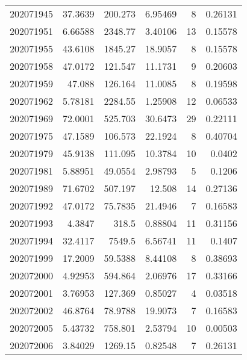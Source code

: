 \begin{tabular}{rrrrrr}
 202071945 &         37.3639  &      200.273  &            6.95469 &           8 & 0.26131 \\
 202071951 &          6.66588 &     2348.77   &            3.40106 &          13 & 0.15578 \\
 202071955 &         43.6108  &     1845.27   &           18.9057  &           8 & 0.15578 \\
 202071958 &         47.0172  &      121.547  &           11.1731  &           9 & 0.20603 \\
 202071959 &         47.088   &      126.164  &           11.0085  &           8 & 0.19598 \\
 202071962 &          5.78181 &     2284.55   &            1.25908 &          12 & 0.06533 \\
 202071969 &         72.0001  &      525.703  &           30.6473  &          29 & 0.22111 \\
 202071975 &         47.1589  &      106.573  &           22.1924  &           8 & 0.40704 \\
 202071979 &         45.9138  &      111.095  &           10.3784  &          10 & 0.0402  \\
 202071981 &          5.88951 &       49.0554 &            2.98793 &           5 & 0.1206  \\
 202071989 &         71.6702  &      507.197  &           12.508   &          14 & 0.27136 \\
 202071992 &         47.0172  &       75.7835 &           21.4946  &           7 & 0.16583 \\
 202071993 &          4.3847  &      318.5    &            0.88804 &          11 & 0.31156 \\
 202071994 &         32.4117  &     7549.5    &            6.56741 &          11 & 0.1407  \\
 202071999 &         17.2009  &       59.5388 &            8.44108 &           8 & 0.38693 \\
 202072000 &          4.92953 &      594.864  &            2.06976 &          17 & 0.33166 \\
 202072001 &          3.76953 &      127.369  &            0.85027 &           4 & 0.03518 \\
 202072002 &         46.8764  &       78.9788 &           19.9073  &           7 & 0.16583 \\
 202072005 &          5.43732 &      758.801  &            2.53794 &          10 & 0.00503 \\
 202072006 &          3.84029 &     1269.15   &            0.82548 &           7 & 0.26131 \\

\end{tabular}
